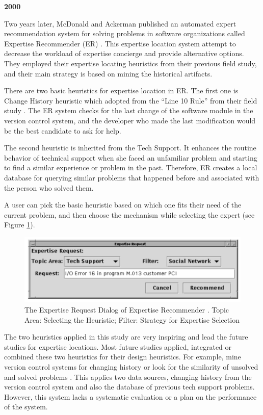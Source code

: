 \textbf{\citeauthor{mcdonald2000expertise} 2000}

Two years later, McDonald and Ackerman published an automated expert recommendation system for solving problems in software organizations called Expertise Recommender (ER) \cite{mcdonald2000expertise}. This expertise location system attempt to decrease the workload of expertise concierge and provide alternative options. They employed their expertise locating heuristics from their previous field study, and their main strategy is based on mining the historical artifacts.

There are two basic heuristics for expertise location in ER. The first one is Change History heuristic which adopted from the ``Line 10 Rule''
from their field study \cite{mcdonald1998just}. The ER system checks for the last change of the software module in the version control system, and the developer who made the last modification would be the best candidate to ask for help.

The second heuristic is inherited from the Tech Support. It enhances the routine behavior of technical support when she faced an unfamiliar problem and starting to find a similar experience or problem in the past. Therefore, ER creates a local database for querying similar problems that happened before and associated with the person who solved them.

A user can pick the basic heuristic based on which one fits their need of the current problem, and then choose the mechanism while selecting the expert (see Figure \ref{ERUI}).

\begin{figure}
\includegraphics[width = 0.5\columnwidth]{ERUI.png}
\centering
\caption{The Expertise Request Dialog of Expertise Recommender \cite{mcdonald2000expertise}. Topic Area: Selecting the Heuristic; Filter: Strategy for Expertise Selection}
\label{ERUI}
\end{figure}

The two heuristics applied in this study are very inspiring and lead the future studies for expertise locations. Most future studies applied, integrated or combined these two heuristics for their design heuristics. For example, mine version control systems for changing history \cite{mockus2002expertise, schuler2008mining} or look for the similarity of unsolved and solved problems \cite{Anvik2006who, xu2016predicting}. This applies two data sources, changing history from the version control system and also the database of previous tech support problems. However, this system lacks a systematic evaluation or a plan on the performance of the system.

